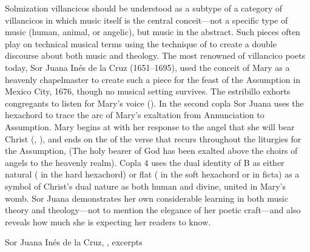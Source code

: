 Solmization villancicos should be understood as a subtype of a category of
villancicos in which music itself is the central conceit---not a specific type
of music (human, animal, or angelic), but music in the abstract.
Such pieces often play on technical musical terms using the technique of
 to create a double discourse about both music and theology.
The most renowned of villancico poets today, Sor Juana Inés de la Cruz
(1651--1695), used the conceit of Mary as a heavenly chapelmaster to create
such a piece for the feast of the Assumption in Mexico City, 1676, though no
musical setting survives.%
    \Autocite[, ]{SorJuana:VC} 
The estribillo exhorts congregants to listen for Mary's voice
().
In the second copla Sor Juana uses the hexachord to trace the arc of Mary's
exaltation from Annunciation to Assumption. 
Mary begins at  with her response to the angel that she will bear
Christ (, ), and ends on the
 of the verse that recurs throughout the liturgies for the Assumption,
 (The holy bearer of God has been exalted above the choirs of angels to
the heavenly realm).
Copla 4 uses the dual identity of B as either natural ( in the hard
hexachord) or flat ( in the soft hexachord or in ficta) as a symbol of
Christ's dual nature as both human and divine, united in Mary's womb.
Sor Juana demonstrates her own considerable learning in both music theory and
theology---not to mention the elegance of her poetic craft---and also reveals
how much she is expecting her readers to know.%
    \Autocites
    {Tenorio:SorJuana}
    {Stevenson:SorJuanaMusicalRapports}


\begin{poemexample}
    \caption{Sor Juana Inés de la Cruz, , excerpts}
    \label{poem:Silencio_Maria-Sor_Juana}
\end{poemexample}

